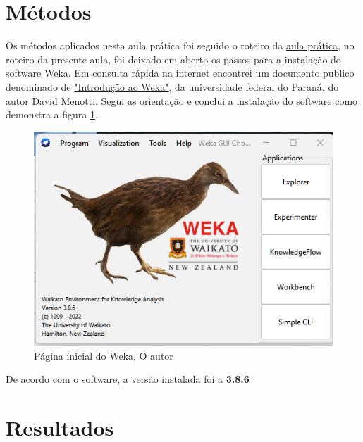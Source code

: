 \section{Métodos}
\par Os métodos aplicados nesta aula prática foi seguido o roteiro da \href{https://github.com/OgliariNatan/neuralPerceptron/blob/main/Aula%20pr%C3%A1tica.pdf}{aula prática}, no roteiro da presente aula, foi deixado em aberto os passos para a instalação do software Weka. Em consulta rápida na internet encontrei um documento publico denominado de \href{https://github.com/OgliariNatan/neuralPerceptron/blob/main/ML-09weka.pdf}{"Introdução ao Weka"}, da universidade federal do Paraná. do autor David Menotti. Segui as orientação e conclui a instalação do software como demonstra a figura \ref{fig:home_weka}.
\begin{figure}[h]
  \center
  \includegraphics[scale=0.5]{figure/home_weka.png}
  \caption{Página inicial do Weka, O autor}\label{fig:home_weka}
\end{figure}
\par De acordo com o software, a versão instalada foi a \textbf{3.8.6}



\section{Resultados}

